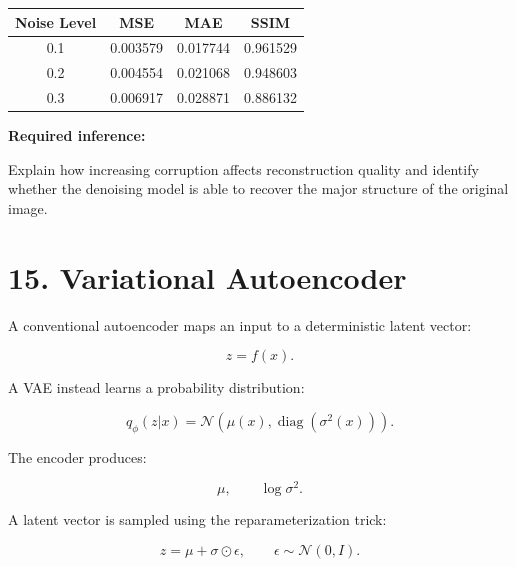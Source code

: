 \documentclass[10pt]{article}
\begin{document}
\begin{center}
\begin{tabular}{|c|c|c|c|}
\hline
Noise Level & MSE & MAE & SSIM\\
\hline
0.1 & 0.003579 & 0.017744 & 0.961529\\
0.2 & 0.004554 & 0.021068 & 0.948603\\
0.3 & 0.006917 & 0.028871 & 0.886132\\
\hline
\end{tabular}
\end{center}


\textbf{Required inference:}

Explain how increasing corruption affects reconstruction quality and identify
whether the denoising model is able to recover the major structure of the
original image.

\section*{15. Variational Autoencoder}

A conventional autoencoder maps an input to a deterministic latent vector:

\[
z=f(x).
\]

A VAE instead learns a probability distribution:

\[
q_{\phi}(z|x)
=
\mathcal{N}
\left(
\mu(x),
\operatorname{diag}(\sigma^2(x))
\right).
\]

The encoder produces:

\[
\mu,\qquad \log\sigma^2.
\]

A latent vector is sampled using the reparameterization trick:

\[
z=\mu+\sigma\odot\epsilon,
\qquad
\epsilon\sim\mathcal{N}(0,I).
\]

\begin{center}
\end{center}
\end{document}
